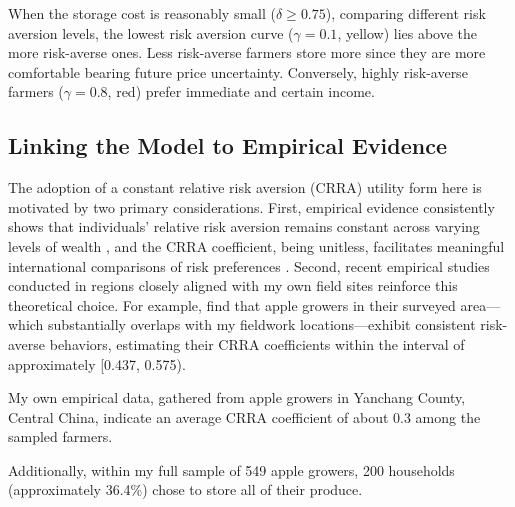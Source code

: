 \documentclass[12pt]{article}
\begin{document}
When the storage cost is reasonably small ($\delta \ge 0.75$), comparing different risk aversion levels, the lowest risk aversion curve ($\gamma=0.1$, yellow) lies above the more risk-averse ones. Less risk-averse farmers store more since they are more comfortable bearing future price uncertainty. Conversely, highly risk-averse farmers ($\gamma=0.8$, red) prefer immediate and certain income.




\subsection{Linking the Model to Empirical Evidence}
The adoption of a constant relative risk aversion (CRRA) utility form here is motivated by two primary considerations. First, empirical evidence consistently shows that individuals' relative risk aversion remains constant across varying levels of wealth \citep{chiappori2011relative}, and the CRRA coefficient, being unitless, facilitates meaningful international comparisons of risk preferences \citep{hardaker2000some}. Second, recent empirical studies conducted in regions closely aligned with my own field sites reinforce this theoretical choice. For example, \cite{jin2024losses} find that apple growers in their surveyed area—which substantially overlaps with my fieldwork locations—exhibit consistent risk-averse behaviors, estimating their CRRA coefficients within the interval of approximately [0.437, 0.575).

My own empirical data, gathered from apple growers in Yanchang County, Central China, indicate an average CRRA coefficient of about 0.3 among the sampled farmers. 

Additionally, within my full sample of 549 apple growers, 200 households (approximately 36.4\%) chose to store all of their produce.


\newpage

\end{document}
